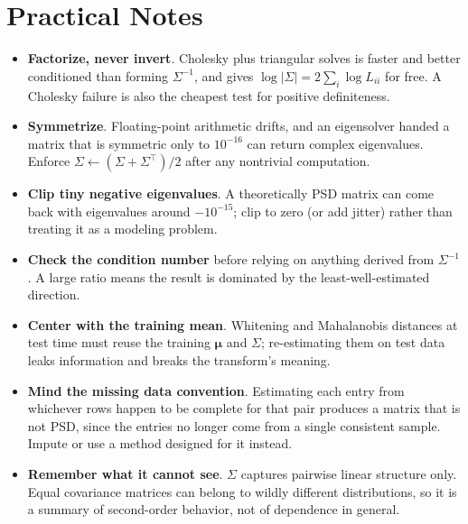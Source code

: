 \documentclass[conference]{IEEEtran}
\begin{document}
\section*{Practical Notes}
\begin{itemize}
    \item \textbf{Factorize, never invert}. Cholesky plus triangular solves is faster and better conditioned than forming $\Sigma^{-1}$, and gives $\log|\Sigma| = 2\sum_i \log L_{ii}$ for free. A Cholesky failure is also the cheapest test for positive definiteness.
    \item \textbf{Symmetrize}. Floating-point arithmetic drifts, and an eigensolver handed a matrix that is symmetric only to $10^{-16}$ can return complex eigenvalues. Enforce $\Sigma \leftarrow (\Sigma + \Sigma^{\!\top})/2$ after any nontrivial computation.
    \item \textbf{Clip tiny negative eigenvalues}. A theoretically PSD matrix can come back with eigenvalues around $-10^{-15}$; clip to zero (or add jitter) rather than treating it as a modeling problem.
    \item \textbf{Check the condition number} before relying on anything derived from $\Sigma^{-1}$. A large ratio means the result is dominated by the least-well-estimated direction.
    \item \textbf{Center with the training mean}. Whitening and Mahalanobis distances at test time must reuse the training $\boldsymbol{\mu}$ and $\Sigma$; re-estimating them on test data leaks information and breaks the transform's meaning.
    \item \textbf{Mind the missing data convention}. Estimating each entry from whichever rows happen to be complete for that pair produces a matrix that is not PSD, since the entries no longer come from a single consistent sample. Impute or use a method designed for it instead.
    \item \textbf{Remember what it cannot see}. $\Sigma$ captures pairwise linear structure only. Equal covariance matrices can belong to wildly different distributions, so it is a summary of second-order behavior, not of dependence in general.
\end{itemize}
\end{document}
